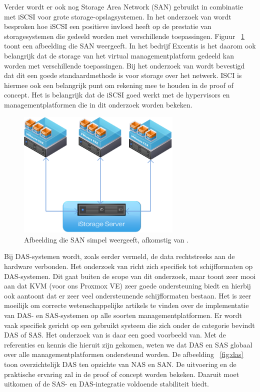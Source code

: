 \FloatBarrier
Verder wordt er ook nog Storage Area Network (SAN) gebruikt in combinatie met iSCSI voor grote storage-opslagsystemen. In het onderzoek van \textcite{park2024performance} wordt besproken hoe iSCSI een positieve invloed heeft op de prestatie van storagesystemen die gedeeld worden met verschillende toepassingen.
Figuur ~\ref{fig:san} toont een afbeelding die SAN weergeeft.
In het bedrijf Excentis is het daarom ook belangrijk dat de storage van het virtual managementplatform gedeeld kan worden met verschillende toepassingen. Bij het onderzoek van \textcite{park2024performance} wordt bevestigd dat dit een goede standaardmethode is voor storage over het netwerk.
ISCI is hiermee ook een belangrijk punt om rekening mee te houden in de proof of concept. Het is belangrijk dat de iSCSI goed werkt met de hypervisors en managementplatformen die in dit onderzoek worden bekeken.

\begin{figure}[h!]
  \centering
  \includegraphics[width=0.7\textwidth]{../onderzoek/nas-isci.png} 
  \caption{Afbeelding die SAN simpel weergeeft, afkomstig van \textcite{kernsafeVMware}.}
  \label{fig:san}
\end{figure}


\FloatBarrier
Bij DAS-systemen wordt, zoals eerder vermeld, de data rechtstreeks aan de hardware verbonden. Het onderzoek van \textcite{joshi2014empirical} richt zich specifiek tot schijfformaten op DAS-systemen.
Dit gaat buiten de scope van dit onderzoek, maar toont zeer mooi aan dat KVM (voor ons Proxmox VE) zeer goede ondersteuning biedt en hierbij ook aantoont dat er zeer veel ondersteunende schijfformaten bestaan.
Het is zeer moeilijk om correcte wetenschappelijke artikels te vinden over de implementatie van DAS- en SAS-systemen op alle soorten managementplatformen.
Er wordt vaak specifiek gericht op een gebruikt systeem die zich onder de categorie bevindt DAS of SAS. Het onderzoek van \textcite{joshi2014empirical} is daar een goed voorbeeld van.
Met de referenties en kennis die hieruit zijn gekomen, weten we dat DAS en SAS globaal over alle managementplatformen ondersteund worden. De afbeelding ~\ref{fig:das} toon overzichtelijk DAS ten opzichte van NAS en SAN.
De uitvoering en de praktische ervaring zal in de proof of concept worden bekeken. Daaruit moet uitkomen of de SAS- en DAS-integratie voldoende stabiliteit biedt.

